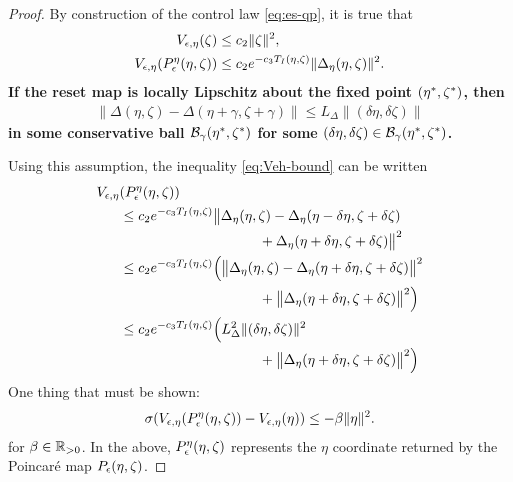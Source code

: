 \documentclass[twocolumn]{article}
\begin{document}
\begin{proof}
  By construction of the control law \eqref{eq:es-qp}, it is true that
  \begin{align}
    V_{\epsilon, \eta}(\zeta) &\leq c_{2} \| \zeta \|^{2},\\
    \nonumber
    V_{\epsilon, \eta}(P_{\epsilon}^{\eta}(\eta, \zeta)) &\leq c_{2} e^{-c_{3} T_{I}(\eta, \zeta)} \| \Delta_{\eta}(\eta, \zeta) \|^{2}.
  \end{align}
  {\bf If the reset map is locally Lipschitz about the fixed point $(\eta^{*}, \zeta^{*})$, then
    \begin{align}
      \label{eq:Veh-bound}
      \| \Delta(\eta, \zeta) - \Delta(\eta + \gamma, \zeta + \gamma) \| \leq L_{\Delta} \| (\delta\eta, \delta\zeta) \|
    \end{align}
    in some conservative ball $\mathcal{B}_{\gamma}(\eta^{*}, \zeta^{*})$ for some $(\delta\eta, \delta\zeta) \in \mathcal{B}_{\gamma}(\eta^{*}, \zeta^{*})$.}

  Using this assumption, the inequality \eqref{eq:Veh-bound} can be written
  \begin{align}
    \nonumber
    \Vee&(\Pe^{\eta}(\eta, \zeta))\\
    \nonumber
    &\leq c_{2} e^{-c_{3} T_{I}(\eta, \zeta)} \big\| \Delta_{\eta}(\eta, \zeta) - \Delta_{\eta}(\eta - \delta \eta, \zeta + \delta \zeta)\\
    \nonumber
    & \hspace{3.5cm}  + \Delta_{\eta}(\eta + \delta \eta, \zeta + \delta \zeta)\big\|^{2}\\
    \nonumber
    &\leq c_{2} e^{-c_{3} T_{I}(\eta, \zeta)} \Big( \big\| \Delta_{\eta}(\eta, \zeta) - \Delta_{\eta}(\eta + \delta \eta, \zeta + \delta \zeta) \big\|^{2}\\
    \nonumber
    & \hspace{3.5cm} + \big\| \Delta_{\eta}(\eta + \delta \eta, \zeta + \delta \zeta)\big\|^{2} \Big)\\
    \nonumber
    &\leq c_{2} e^{-c_{3} T_{I}(\eta, \zeta)} \Big( L_{\Delta}^{2} \| (\delta \eta, \delta \zeta) \|^{2}\\
    \nonumber
    & \hspace{3.5cm} + \big\| \Delta_{\eta}(\eta + \delta \eta, \zeta + \delta \zeta)\big\|^{2} \Big)
  \end{align}
  One thing that must be shown:
  \begin{align}
    \sigma(V_{\epsilon, \eta}(P_{\epsilon}^{\eta}(\eta, \zeta)) - V_{\epsilon, \eta}(\eta)) \leq -\beta \| \eta \|^{2}.
  \end{align}
  for $\beta \in \mathbb{R}_{> 0}$.
  In the above, $P_{\epsilon}^{\eta}(\eta, \zeta)$ represents the $\eta$ coordinate returned by the Poincar{\'e} map $P_{\epsilon}(\eta, \zeta)$.
\end{proof}
\end{document}
